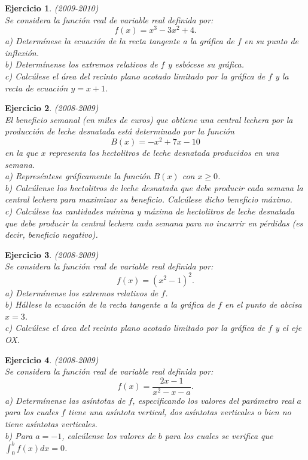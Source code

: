 \documentclass[12pt, a4paper]{amsart}
\newtheorem{ejer}{Ejercicio}
\begin{document}
\begin{ejer}\em (2009-2010)\\%
Se considera la función real de variable real definida por:
$$
f(x)=x^3-3x^2+4.
$$
a) Determínese la ecuación de la recta tangente a la gráfica de $f$ en su punto de inflexión.\\
b) Determínense los extremos relativos de $f$ y esbócese su gráfica.\\
c) Calcúlese el área del recinto plano acotado limitado por la gráfica de $f$ y la recta de ecuación $y=x+1$.
\end{ejer}

\begin{ejer}\em (2008-2009)\\%
El beneficio semanal (en miles de euros) que obtiene una central lechera por la producción de leche desnatada está determinado por la función
$$
B(x)=-x^2+7x-10
$$
en la que $x$ representa los hectolitros de leche desnatada producidos en una semana.\\
a) Represéntese gráficamente la función $B(x)$ con $x\geq 0$.\\
b) Calcúlense los hectolitros de leche desnatada que debe producir cada semana la central lechera para maximizar su beneficio. Calcúlese dicho beneficio máximo.\\
c) Calcúlese las cantidades mínima y máxima de hectolitros de leche desnatada que debe producir la central lechera cada semana para no incurrir en pérdidas (es decir, beneficio negativo).
\end{ejer}

\begin{ejer}\em (2008-2009)\\%
Se considera la función real de variable real definida por:
$$
f(x)=(x^2-1)^2.
$$
a) Determínense los extremos relativos de $f$.\\
b) Hállese la ecuación de la recta tangente a la gráfica de $f$ en el punto de abcisa $x=3$.\\
c) Calcúlese el área del recinto plano acotado limitado por la gráfica de  $f$ y el eje OX.
\end{ejer}

\begin{ejer}\em (2008-2009)\\
Se considera la función real de variable real definida por:
$$
f(x)=\frac{2x-1}{x^2-x-a}.
$$
a) Determínense las asíntotas de $f$, especificando los valores del parámetro real $a$ para los cuales $f$ tiene una asíntota vertical, dos asíntotas verticales o bien no tiene asíntotas verticales.\\
b) Para $a=-1$, calcúlense los valores de $b$ para los cuales se verifica que $\int_0^b f(x)dx=0$.
\end{ejer}
\end{document}
